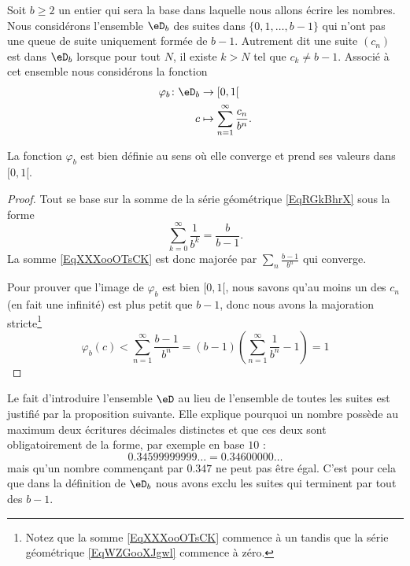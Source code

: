 \begin{normaltext}      \label{NORMALooTZWYooPMgOIm}
    Soit \( b\geq 2\) un entier qui sera la base dans laquelle nous allons écrire les nombres. Nous considérons l'ensemble \( \eD_b\) des suites dans \( \{ 0,1,\ldots, b-1 \}\) qui n'ont pas une queue de suite uniquement formée de \( b-1\). Autrement dit une suite \( (c_n)\) est dans \( \eD_b\) lorsque pour tout \( N\), il existe \( k>N\) tel que \( c_k\neq b-1\). Associé à cet ensemble nous considérons la fonction
    \begin{equation}    \label{EqXXXooOTsCK}
        \begin{aligned}
            \varphi_b\colon \eD_b&\to \mathopen[ 0 , 1 [ \\
                c&\mapsto \sum_{n=1}^{\infty}\frac{ c_n }{ b^n }.
        \end{aligned}
    \end{equation}
\end{normaltext}

\begin{lemma}
    La fonction \( \varphi_b\) est bien définie au sens où elle converge et prend ses valeurs dans \( \mathopen[ 0 , 1 [\).
\end{lemma}

\begin{proof}
    Tout se base sur la somme de la série géométrique \eqref{EqRGkBhrX} sous la forme
    \begin{equation}    \label{EqWZGooXJgwl}
        \sum_{k=0}^{\infty}\frac{1}{ b^k }=\frac{ b }{ b-1 }.
    \end{equation}
    La somme \eqref{EqXXXooOTsCK} est donc majorée par \( \sum_n\frac{ b-1 }{ b^n }\) qui converge.

    Pour prouver que l'image de \( \varphi_b\) est bien \( \mathopen[ 0 , 1 [\), nous savons qu'au moins un des \( c_n\) (en fait une infinité) est plus petit que \( b-1\), donc nous avons la majoration stricte\footnote{Notez que la somme \eqref{EqXXXooOTsCK} commence à un tandis que la série géométrique \eqref{EqWZGooXJgwl} commence à zéro.}
        \begin{equation}
            \varphi_b(c)<\sum_{n=1}^{\infty}\frac{ b-1 }{ b^n }=(b-1)\left( \sum_{n=1}^{\infty}\frac{1}{ b^n }-1 \right)=1
        \end{equation}
\end{proof}

Le fait d'introduire l'ensemble \( \eD\) au lieu de l'ensemble de toutes les suites est justifié par la proposition suivante. Elle explique pourquoi un nombre possède au maximum deux écritures décimales distinctes et que ces deux sont obligatoirement de la forme, par exemple en base \( 10\) :
\begin{equation}
    0.34599999999\ldots=0.34600000\ldots
\end{equation}
mais qu'un nombre commençant par \( 0.347\) ne peut pas être égal. C'est pour cela que dans la définition de \( \eD_b\) nous avons exclu les suites qui terminent par tout des \( b-1\).

